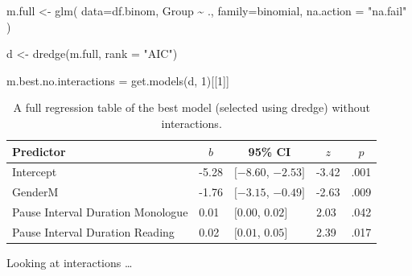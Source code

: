 \documentclass[
  english,
  doc,floatsintext]{apa6}
\newenvironment{Shaded}{\begin{snugshade}}{\end{snugshade}}
\newcommand{\AttributeTok}[1]{\textcolor[rgb]{0.77,0.63,0.00}{#1}}
\newcommand{\DecValTok}[1]{\textcolor[rgb]{0.00,0.00,0.81}{#1}}
\newcommand{\FunctionTok}[1]{\textcolor[rgb]{0.00,0.00,0.00}{#1}}
\newcommand{\NormalTok}[1]{#1}
\newcommand{\OtherTok}[1]{\textcolor[rgb]{0.56,0.35,0.01}{#1}}
\newcommand{\SpecialCharTok}[1]{\textcolor[rgb]{0.00,0.00,0.00}{#1}}
\newcommand{\StringTok}[1]{\textcolor[rgb]{0.31,0.60,0.02}{#1}}
\begin{document}
\begin{Shaded}
\begin{Highlighting}[]
\NormalTok{m.full }\OtherTok{\textless{}{-}} \FunctionTok{glm}\NormalTok{(}
  \AttributeTok{data=}\NormalTok{df.binom, Group }\SpecialCharTok{\textasciitilde{}}\NormalTok{ .,}
  \AttributeTok{family=}\NormalTok{binomial, }
  \AttributeTok{na.action =} \StringTok{"na.fail"}
\NormalTok{)}

\NormalTok{d }\OtherTok{\textless{}{-}} \FunctionTok{dredge}\NormalTok{(m.full, }\AttributeTok{rank =} \StringTok{"AIC"}\NormalTok{)}

\NormalTok{m.best.no.interactions }\OtherTok{=} \FunctionTok{get.models}\NormalTok{(d, }\DecValTok{1}\NormalTok{)[[}\DecValTok{1}\NormalTok{]]}
\end{Highlighting}
\end{Shaded}

\begin{table}[tbp]

\begin{center}
\begin{threeparttable}

\caption{\label{tab:table-best-model-dredge}A full regression table of the best model (selected using dredge) without interactions.}

\begin{tabular}{lllll}
\toprule
Predictor & \multicolumn{1}{c}{$b$} & \multicolumn{1}{c}{95\% CI} & \multicolumn{1}{c}{$z$} & \multicolumn{1}{c}{$p$}\\
\midrule
Intercept & -5.28 & $[-8.60$, $-2.53]$ & -3.42 & .001\\
GenderM & -1.76 & $[-3.15$, $-0.49]$ & -2.63 & .009\\
Pause Interval Duration Monologue & 0.01 & $[0.00$, $0.02]$ & 2.03 & .042\\
Pause Interval Duration Reading & 0.02 & $[0.01$, $0.05]$ & 2.39 & .017\\
\bottomrule
\end{tabular}

\end{threeparttable}
\end{center}

\end{table}

Looking at interactions \ldots{}
\end{document}
